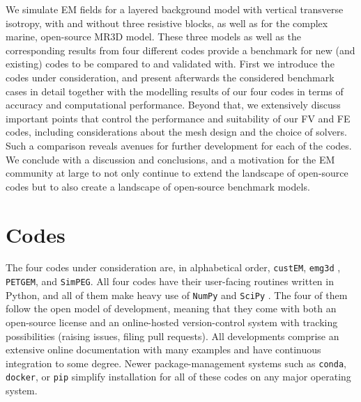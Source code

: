 \documentclass[extra, camera,%
]{gji}
\newcommand{\emg}[2]{\texttt{emg#1#2}\xspace}
\newcommand{\simpeg}{\texttt{SimPEG}\xspace}
\newcommand{\custem}{\texttt{custEM}\xspace}
\newcommand{\petgem}{\texttt{PETGEM}\xspace}
\begin{document}
We simulate EM fields for a layered background model with vertical transverse isotropy, with and without three resistive blocks, as well as for the complex marine, open-source MR3D model. These three models as well as the corresponding results from four different codes provide a benchmark for new (and existing) codes to be compared to and validated with. First we introduce the codes under consideration, and present afterwards the considered benchmark cases in detail together with the modelling results of our four codes in terms of accuracy and computational performance. Beyond that, we extensively discuss important points that control the performance and suitability of our FV and FE codes, including considerations about the mesh design and the choice of solvers. Such a comparison reveals avenues for further development for each of the codes. We conclude with a discussion and conclusions, and a motivation for the EM community at large to not only continue to extend the landscape of open-source codes but to also create a landscape of open-source benchmark models.

\section{Codes}

The four codes under consideration are, in alphabetical order, \custem \citep{GEO.19.Rochlitz}, \emg3d \citep{JOSS.19.Werthmuller}, \petgem \citep{CAG.18.CastilloReyes, GJI.19.CastilloReyes}, and \simpeg \citep{CAG.15.Cockett, CAG.17.Heagy}. All four codes have their user-facing routines written in Python, and all of them make heavy use of \texttt{NumPy} \citep{NAT.20.Harris} and \texttt{SciPy} \citep{NM.20.Virtanen}. The four of them follow the open model of development, meaning that they come with both\deleted{,} an open-source license and an online-hosted version-control system with tracking possibilities (raising issues, filing pull requests). All developments comprise an extensive online documentation with many examples and have continuous integration to some degree. Newer package-management systems such as \texttt{conda}, \texttt{docker}, or \texttt{pip} simplify installation for all of these codes on any major operating system.
\end{document}
